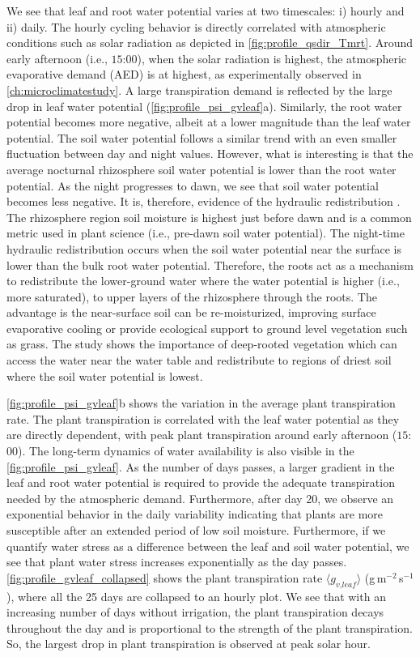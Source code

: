 We see that leaf and root water potential varies at two timescales: i) hourly and ii) daily. The hourly cycling behavior is directly correlated with atmospheric conditions such as solar radiation as depicted in \cref{fig:profile_qsdir_Tmrt}. Around early afternoon (i.e., $15$:$00$), when the solar radiation is highest, the atmospheric evaporative demand (AED) is at highest, as experimentally observed in \cref{ch:microclimatestudy}. A large transpiration demand is reflected by the large drop in leaf water potential (\cref{fig:profile_psi_gvleaf}a). Similarly, the root water potential becomes more negative, albeit at a lower magnitude than the leaf water potential. The soil water potential follows a similar trend with an even smaller fluctuation between day and night values. However, what is interesting is that the average nocturnal rhizosphere soil water potential is lower than the root water potential. As the night progresses to dawn, we see that soil water potential becomes less negative. It is, therefore, evidence of the hydraulic redistribution \citep{Volpe2013, Huang2017}. The rhizosphere region soil moisture is highest just before dawn and is a common metric used in plant science (i.e., pre-dawn soil water potential). The night-time hydraulic redistribution occurs when the soil water potential near the surface is lower than the bulk root water potential. Therefore, the roots act as a mechanism to redistribute the lower-ground water where the water potential is higher (i.e., more saturated), to upper layers of the rhizosphere through the roots. The advantage is the near-surface soil can be re-moisturized, improving surface evaporative cooling or provide ecological support to ground level vegetation such as grass. The study shows the importance of deep-rooted vegetation which can access the water near the water table and redistribute to regions of driest soil where the soil water potential is lowest.

\cref{fig:profile_psi_gvleaf}b shows the variation in the average plant transpiration rate. The plant transpiration is correlated with the leaf water potential as they are directly dependent, with peak plant transpiration around early afternoon ($15$:$00$).  The long-term dynamics of water availability is also visible in the \cref{fig:profile_psi_gvleaf}. As the number of days passes, a larger gradient in the leaf and root water potential is required to provide the adequate transpiration needed by the atmospheric demand. Furthermore, after day 20, we observe an exponential behavior in the daily variability indicating that plants are more susceptible after an extended period of low soil moisture. Furthermore, if we quantify water stress as a difference between the leaf and soil water potential, we see that plant water stress increases exponentially as the day passes. \cref{fig:profile_gvleaf_collapsed} shows the plant transpiration rate $\langle g_{\textit{v,leaf}} \rangle$ (g\,m$^{-2}$\,s$^{-1}$), where all the 25 days are collapsed to an hourly plot. We see that with an increasing number of days without irrigation, the plant transpiration decays throughout the day and is proportional to the strength of the plant transpiration. So, the largest drop in plant transpiration is observed at peak solar hour.

